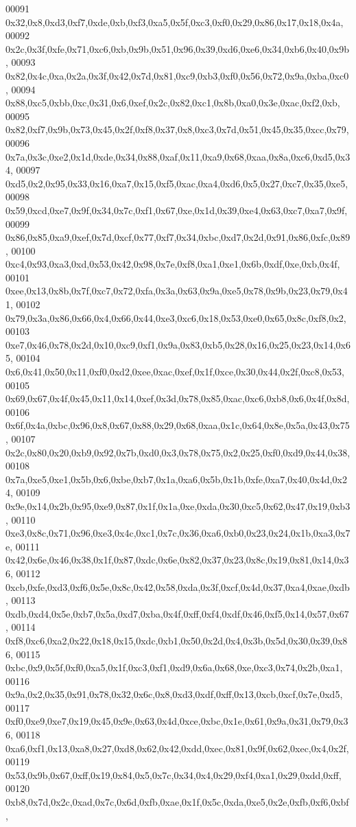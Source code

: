 \begin{DoxyCode}
00091   0x32,0x8,0xd3,0xf7,0xde,0xb,0xf3,0xa5,0x5f,0xc3,0xf0,0x29,0x86,0x17,0x18,0x4a,
00092   0x2c,0x3f,0xfe,0x71,0xc6,0xb,0x9b,0x51,0x96,0x39,0xd6,0xe6,0x34,0xb6,0x40,0x9b,
00093   0x82,0x4c,0xa,0x2a,0x3f,0x42,0x7d,0x81,0xc9,0xb3,0xf0,0x56,0x72,0x9a,0xba,0xc0,
00094   0x88,0xc5,0xbb,0xc,0x31,0x6,0xef,0x2c,0x82,0xc1,0x8b,0xa0,0x3e,0xac,0xf2,0xb,
00095   0x82,0xf7,0x9b,0x73,0x45,0x2f,0xf8,0x37,0x8,0xc3,0x7d,0x51,0x45,0x35,0xcc,0x79,
00096   0x7a,0x3c,0xe2,0x1d,0xde,0x34,0x88,0xaf,0x11,0xa9,0x68,0xaa,0x8a,0xc6,0xd5,0x34,
00097   0xd5,0x2,0x95,0x33,0x16,0xa7,0x15,0xf5,0xac,0xa4,0xd6,0x5,0x27,0xc7,0x35,0xe5,
00098   0x59,0xcd,0xe7,0x9f,0x34,0x7c,0xf1,0x67,0xe,0x1d,0x39,0xe4,0x63,0xc7,0xa7,0x9f,
00099   0x86,0x85,0xa9,0xef,0x7d,0xcf,0x77,0xf7,0x34,0xbc,0xd7,0x2d,0x91,0x86,0xfc,0x89,
00100   0xc4,0x93,0xa3,0xd,0x53,0x42,0x98,0x7e,0xf8,0xa1,0xe1,0x6b,0xdf,0xe,0xb,0x4f,
00101   0xee,0x13,0x8b,0x7f,0xc7,0x72,0xfa,0x3a,0x63,0x9a,0xe5,0x78,0x9b,0x23,0x79,0x41,
00102   0x79,0x3a,0x86,0x66,0x4,0x66,0x44,0xe3,0xc6,0x18,0x53,0xe0,0x65,0x8c,0xf8,0x2,
00103   0xe7,0x46,0x78,0x2d,0x10,0xc9,0xf1,0x9a,0x83,0xb5,0x28,0x16,0x25,0x23,0x14,0x65,
00104   0x6,0x41,0x50,0x11,0xf0,0xd2,0xee,0xac,0xef,0x1f,0xce,0x30,0x44,0x2f,0xc8,0x53,
00105   0x69,0x67,0x4f,0x45,0x11,0x14,0xef,0x3d,0x78,0x85,0xac,0xc6,0xb8,0x6,0x4f,0x8d,
00106   0x6f,0x4a,0xbc,0x96,0x8,0x67,0x88,0x29,0x68,0xaa,0x1c,0x64,0x8e,0x5a,0x43,0x75,
00107   0x2c,0x80,0x20,0xb9,0x92,0x7b,0xd0,0x3,0x78,0x75,0x2,0x25,0xf0,0xd9,0x44,0x38,
00108   0x7a,0xe5,0xe1,0x5b,0x6,0xbe,0xb7,0x1a,0xa6,0x5b,0x1b,0xfe,0xa7,0x40,0x4d,0x24,
00109   0x9e,0x14,0x2b,0x95,0xe9,0x87,0x1f,0x1a,0xe,0xda,0x30,0xc5,0x62,0x47,0x19,0xb3,
00110   0xe3,0x8c,0x71,0x96,0xe3,0x4c,0xc1,0x7c,0x36,0xa6,0xb0,0x23,0x24,0x1b,0xa3,0x7e,
00111   0x42,0x6e,0x46,0x38,0x1f,0x87,0xdc,0x6e,0x82,0x37,0x23,0x8c,0x19,0x81,0x14,0x36,
00112   0xcb,0xfe,0xd3,0xf6,0x5e,0x8c,0x42,0x58,0xda,0x3f,0xcf,0x4d,0x37,0xa4,0xae,0xdb,
00113   0xdb,0xd4,0x5e,0xb7,0x5a,0xd7,0xba,0x4f,0xff,0xf4,0xdf,0x46,0xf5,0x14,0x57,0x67,
00114   0xf8,0xc6,0xa2,0x22,0x18,0x15,0xdc,0xb1,0x50,0x2d,0x4,0x3b,0x5d,0x30,0x39,0x86,
00115   0xbc,0x9,0x5f,0xf0,0xa5,0x1f,0xc3,0xf1,0xd9,0x6a,0x68,0xe,0xc3,0x74,0x2b,0xa1,
00116   0x9a,0x2,0x35,0x91,0x78,0x32,0x6c,0x8,0xd3,0xdf,0xff,0x13,0xcb,0xcf,0x7e,0xd5,
00117   0xf0,0xe9,0xe7,0x19,0x45,0x9e,0x63,0x4d,0xce,0xbc,0x1e,0x61,0x9a,0x31,0x79,0x36,
00118   0xa6,0xf1,0x13,0xa8,0x27,0xd8,0x62,0x42,0xdd,0xec,0x81,0x9f,0x62,0xec,0x4,0x2f,
00119   0x53,0x9b,0x67,0xff,0x19,0x84,0x5,0x7c,0x34,0x4,0x29,0xf4,0xa1,0x29,0xdd,0xff,
00120   0xb8,0x7d,0x2c,0xad,0x7c,0x6d,0xfb,0xae,0x1f,0x5c,0xda,0xe5,0x2e,0xfb,0xf6,0xbf,

\end{DoxyCode}
